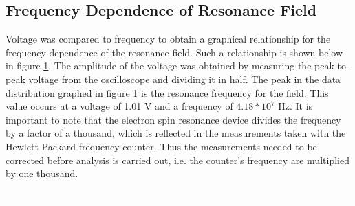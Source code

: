 \documentclass[a4paper]{article}
\begin{document}
\subsection{Frequency Dependence of Resonance Field}

\qq Voltage was compared to frequency to obtain a graphical
relationship for the frequency dependence of the resonance field. Such a relationship is shown below in figure \ref{FrequencyDependence}.
The amplitude of the voltage was obtained by measuring the peak-to-peak voltage from the oscilloscope and dividing it in half. The peak in the data distribution graphed in figure \ref{FrequencyDependence} is the resonance frequency for the
field. This value occurs at a voltage of 1.01 V and a frequency of
$4.18*10^7$ Hz. It is important to note that the electron spin
resonance device divides the frequency by a factor of a thousand, which is reflected in the measurements taken with the
 Hewlett-Packard frequency counter. Thus the measurements needed to be corrected before analysis is carried out, i.e. the
counter's frequency are multiplied by one thousand.

\begin{figure}[H]
\centering
\includegraphics[width=1.0]{Plots/ExpFreqVsVolt/freq_depen.pdf}
\label{FrequencyDependence}
\end{figure}
\end{document}
